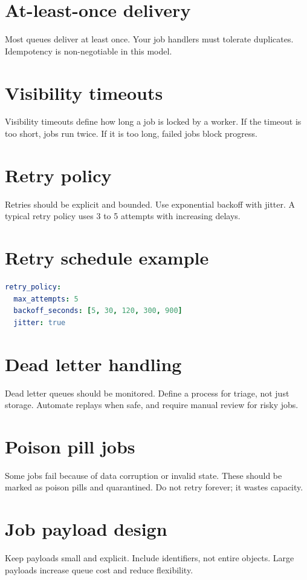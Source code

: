 \section{At-least-once delivery}
Most queues deliver at least once.
Your job handlers must tolerate duplicates.
Idempotency is non-negotiable in this model.

\section{Visibility timeouts}
Visibility timeouts define how long a job is locked by a worker.
If the timeout is too short, jobs run twice.
If it is too long, failed jobs block progress.

\section{Retry policy}
Retries should be explicit and bounded.
Use exponential backoff with jitter.
A typical retry policy uses 3 to 5 attempts with increasing delays.

\section{Retry schedule example}
\begin{lstlisting}[language=YAML]
retry_policy:
  max_attempts: 5
  backoff_seconds: [5, 30, 120, 300, 900]
  jitter: true
\end{lstlisting}

\section{Dead letter handling}
Dead letter queues should be monitored.
Define a process for triage, not just storage.
Automate replays when safe, and require manual review for risky jobs.

\section{Poison pill jobs}
Some jobs fail because of data corruption or invalid state.
These should be marked as poison pills and quarantined.
Do not retry forever; it wastes capacity.

\section{Job payload design}
Keep payloads small and explicit.
Include identifiers, not entire objects.
Large payloads increase queue cost and reduce flexibility.

